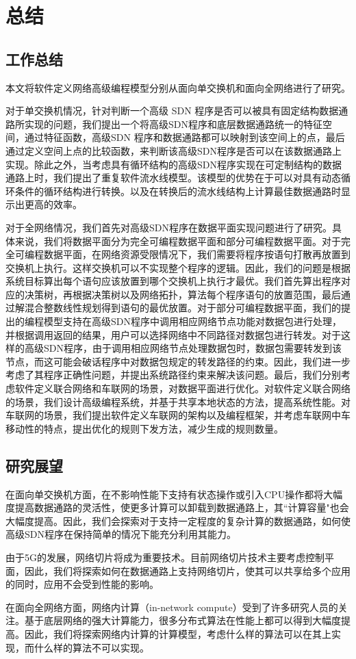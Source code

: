 \chapter{总结}

\section{工作总结}

本文将软件定义网络高级编程模型分别从面向单交换机和面向全网络进行了研究。

对于单交换机情况，针对判断一个高级 SDN 程序是否可以被具有固定结构数据通路所实现的问题，我们提出一个将高级SDN程序和底层数据通路统一的特征空间，通过特征函数，高级SDN 程序和数据通路都可以映射到该空间上的点，最后通过定义空间上点的比较函数，来判断该高级SDN程序是否可以在该数据通路上实现。除此之外，当考虑具有循环结构的高级SDN程序实现在可定制结构的数据通路上时，我们提出了重复软件流水线模型。该模型的优势在于可以对具有动态循环条件的循环结构进行转换。以及在转换后的流水线结构上计算最佳数据通路时显示出更高的效率。

对于全网络情况，我们首先对高级SDN程序在数据平面实现问题进行了研究。具体来说，我们将数据平面分为完全可编程数据平面和部分可编程数据平面。对于完全可编程数据平面，在网络资源受限情况下，我们需要将程序按语句打散再放置到交换机上执行。这样交换机可以不实现整个程序的逻辑。因此，我们的问题是根据系统目标算出每个语句应该放置到哪个交换机上执行才最优。我们首先算出程序对应的决策树，再根据决策树以及网络拓扑，算法每个程序语句的放置范围，最后通过解混合整数线性规划得到语句的最优放置。对于部分可编程数据平面，我们的提出的编程模型支持在高级SDN程序中调用相应网络节点功能对数据包进行处理，并根据调用返回的结果，用户可以选择网络中不同路径对数据包进行转发。对于这样的高级SDN程序，由于调用相应网络节点处理数据包时，数据包需要转发到该节点，而这可能会破话程序中对数据包规定的转发路径的约束。因此，我们进一步考虑了其程序正确性问题，并提出系统路径约束来解决该问题。最后，我们分别考虑软件定义联合网络和车联网的场景，对数据平面进行优化。对软件定义联合网络的场景，我们设计高级编程系统，并基于共享本地状态的方法，提高系统性能。对车联网的场景，我们提出软件定义车联网的架构以及编程框架，并考虑车联网中车移动性的特点，提出优化的规则下发方法，减少生成的规则数量。


\section{研究展望}

在面向单交换机方面，在不影响性能下支持有状态操作或引入CPU操作都将大幅度提高数据通路的灵活性，使更多计算可以卸载到数据通路上，其``计算容量"也会大幅度提高。因此，我们会探索对于支持一定程度的复杂计算的数据通路，如何使高级SDN程序在保持简单的情况下能充分利用其能力。

由于5G的发展，网络切片将成为重要技术。目前网络切片技术主要考虑控制平面，因此，我们将探索如何在数据通路上支持网络切片，使其可以共享给多个应用的同时，应用不会受到性能的影响。

在面向全网络方面，网络内计算（in-network compute）受到了许多研究人员的关注。基于底层网络的强大计算能力，很多分布式算法在性能上都可以得到大幅度提高。因此，我们将探索网络内计算的计算模型，考虑什么样的算法可以在其上实现，而什么样的算法不可以实现。

